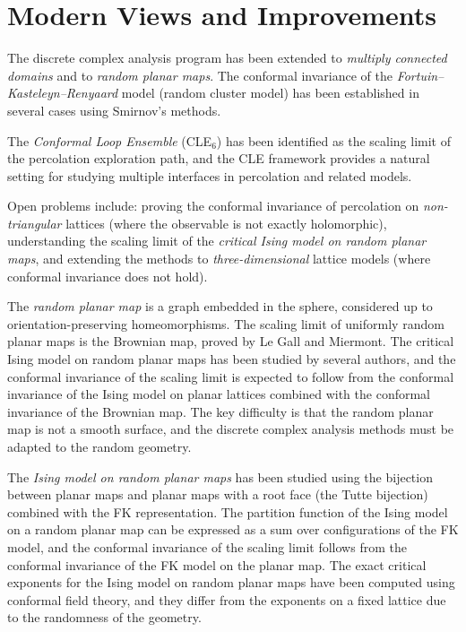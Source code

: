 \section{Modern Views and Improvements}\label{ch2010stanislavsmirnov:modern-views-and-improvements}

The discrete complex analysis program has been extended to \emph{multiply connected domains} and to \emph{random planar maps}. The conformal invariance of the \emph{Fortuin--Kasteleyn--Renyaard} model (random cluster model) has been established in several cases using Smirnov's methods.

The \emph{Conformal Loop Ensemble} (CLE$_6$) has been identified as the scaling limit of the percolation exploration path, and the CLE framework provides a natural setting for studying multiple interfaces in percolation and related models.

Open problems include: proving the conformal invariance of percolation on \emph{non-triangular} lattices (where the observable is not exactly holomorphic), understanding the scaling limit of the \emph{critical Ising model on random planar maps}, and extending the methods to \emph{three-dimensional} lattice models (where conformal invariance does not hold).

The \emph{random planar map} is a graph embedded in the sphere, considered up to orientation-preserving homeomorphisms. The scaling limit of uniformly random planar maps is the Brownian map, proved by Le Gall and Miermont. The critical Ising model on random planar maps has been studied by several authors, and the conformal invariance of the scaling limit is expected to follow from the conformal invariance of the Ising model on planar lattices combined with the conformal invariance of the Brownian map. The key difficulty is that the random planar map is not a smooth surface, and the discrete complex analysis methods must be adapted to the random geometry.

The \emph{Ising model on random planar maps} has been studied using the bijection between planar maps and planar maps with a root face (the Tutte bijection) combined with the FK representation. The partition function of the Ising model on a random planar map can be expressed as a sum over configurations of the FK model, and the conformal invariance of the scaling limit follows from the conformal invariance of the FK model on the planar map. The exact critical exponents for the Ising model on random planar maps have been computed using conformal field theory, and they differ from the exponents on a fixed lattice due to the randomness of the geometry.

